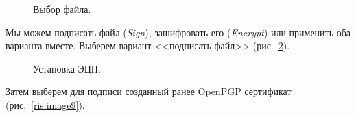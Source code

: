 \documentclass[10pt,a4paper,titlepage]{article}
\begin{document}
\begin{figure}[!h]	
\caption{Выбор файла.}
\label{ris:image7}
\end{figure}

\pagebreak
Мы можем подписать файл (\textit{Sign}), зашифровать его (\textit{Encrypt}) или применить оба варианта вместе. Выберем вариант <<подписать файл>> \mbox{(рис. \ref{ris:image8})}.

\begin{figure}[!h]	
\caption{Установка ЭЦП.}
\label{ris:image8}
\end{figure}

\pagebreak
Затем выберем для подписи созданный ранее OpenPGP сертификат \mbox{(рис. \ref{ris:image9})}.
\end{document}
